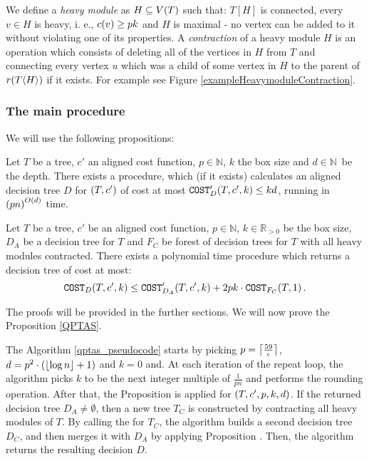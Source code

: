 
We define a \textit{heavy module} as $H\subseteq V\mathopen{}\left( T \right)$ such that: $T[H]$ is connected, every $v \in H$ is heavy, i. e., $c\mathopen{}\left( v \right)\geq pk$ and $H$ is maximal - no vertex can be added to it without violating one of its properties. A \textit{contraction} of a heavy module $H$ is an operation which consists of deleting all of the vertices in $H$ from $T$ and connecting every vertex $u$ which was a child of some vertex in $H$ to the parent of $r\mathopen{}\left( T\mathopen{}\langle H \rangle \right)$ if it exists. For example see Figure \ref{exampleHeavymoduleContraction}.

\subsubsection{The main procedure}

We will use the following propositions:
\begin{proposition}\label{DPTimelinesCostsProposition}
     Let $T$ be a tree, $c'$ an aligned cost function, $p\in \mathbb{N}$, $k$ the box size and $d\in \mathbb{N}$~be the depth. There exists a \FDPTimelinesCosts procedure, which (if it exists) calculates an aligned decision tree $D$ for $\mathopen{}\left( T,c' \right)$ of cost at most $\texttt{COST}'_D\mathopen{}\left( T,c',k \right)\leq kd$, running in $\mathopen{}\left( pn \right)^{O\mathopen{}\left( d \right)}$ time.
\end{proposition}
\begin{proposition}\label{MergeDTsProposition}
    Let $T$ be a tree, $c'$ be an aligned cost function, $p\in \mathbb{N}$, $k\in \mathbb{R}_{>0}$ be the box size, $D_A$ be a decision tree for $T$ and $F_C$ be forest of decision trees for $T$ with all heavy modules contracted. There exists a polynomial time \FMergeDTs procedure which returns a decision tree of cost at most:
        $$
            \texttt{COST}_{D}\mathopen{}\left( T,c',k \right)\leq\texttt{COST}'_{D_A}\mathopen{}\left( T,c',k \right)+2pk\cdot \texttt{COST}_{F_C}\mathopen{}\left( T,1 \right).
        $$
\end{proposition}
The proofs will be provided in the further sections.
We will now prove the Proposition \ref{QPTAS}.



The Algorithm \ref{qptas_pseudocode} starts by picking $p=\mathopen{}\left\lceil \frac{59}{\epsilon} \right\rceil$, $d=p^2\cdot\mathopen{}\left( \mathopen{}\left\lfloor \log n \right\rfloor+1 \right)$ and $k=0$ and. At each iteration of the repeat loop, the algorithm picks $k$ to be the next 
integer multiple of $\frac{1}{pn}$ and performs the rounding operation. After that, the Proposition \label{DPTimelinesCostsProposition} is applied for $\mathopen{}\left( T,c',p,k,d \right)$. If the returned decision tree $D_A\neq\emptyset$, then a new tree $T_C$ is constructed by contracting all heavy modules of $T$. By calling the \FRankingBasedDT for $T_C$, the algorithm builds a second decision tree $D_C$, and then merges it with $D_A$ by applying Proposition \label{MergeDTsProposition}. Then, the algorithm returns the resulting decision $D$.

